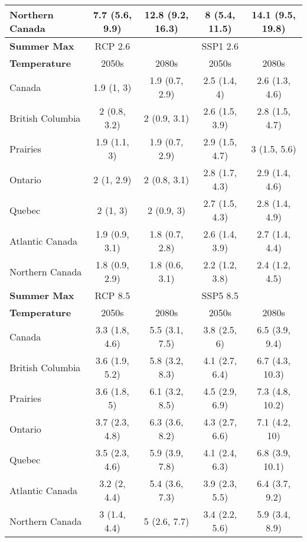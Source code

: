 \documentclass[]{scrartcl}
\begin{document}
\begin{appendices}
\begin{table}[t]
\begin{center}
\begin{tabularx}{\linewidth}{|L|cc|cc|}
			Northern Canada & 7.7 (5.6, 9.9) & 12.8 (9.2, 16.3) & 8 (5.4, 11.5) & 14.1 (9.5, 19.8) \\ 				
			\hline
			\hline
			\textbf{Summer Max} & RCP 2.6 & & SSP1 2.6 &   \\
			\textbf{Temperature} & 2050s & 2080s & 2050s &2080s \\
			\hline
			Canada & 1.9 (1, 3) & 1.9 (0.7, 2.9) & 2.5 (1.4, 4) & 2.6 (1.3, 4.6) \\ 
			British Columbia & 2 (0.8, 3.2) & 2 (0.9, 3.1) & 2.6 (1.5, 3.9) & 2.8 (1.5, 4.7) \\ 
			Prairies & 1.9 (1.1, 3) & 1.9 (0.7, 2.9) & 2.9 (1.5, 4.7) & 3 (1.5, 5.6) \\ 
			Ontario & 2 (1, 2.9) & 2 (0.8, 3.1) & 2.8 (1.7, 4.3) & 2.9 (1.4, 4.6) \\ 
			Quebec & 2 (1, 3) & 2 (0.9, 3) & 2.7 (1.5, 4.3) & 2.8 (1.4, 4.9) \\ 
			Atlantic Canada & 1.9 (0.9, 3.1) & 1.8 (0.7, 2.8) & 2.6 (1.4, 3.9) & 2.7 (1.4, 4.4) \\ 
			Northern Canada & 1.8 (0.9, 2.9) & 1.8 (0.6, 3.1) & 2.2 (1.2, 3.8) & 2.4 (1.2, 4.5) \\ 
			\hline
			\textbf{Summer Max} & RCP 8.5 & & SSP5 8.5 &   \\
			\textbf{Temperature} & 2050s & 2080s & 2050s &2080s \\
			\hline
			Canada & 3.3 (1.8, 4.6) & 5.5 (3.1, 7.5) & 3.8 (2.5, 6) & 6.5 (3.9, 9.4) \\ 
			British Columbia & 3.6 (1.9, 5.2) & 5.8 (3.2, 8.3) & 4.1 (2.7, 6.4) & 6.7 (4.3, 10.3) \\ 
			Prairies & 3.6 (1.8, 5) & 6.1 (3.2, 8.5) & 4.5 (2.9, 6.9) & 7.3 (4.8, 10.2) \\ 
			Ontario & 3.7 (2.3, 4.8) & 6.3 (3.6, 8.2) & 4.3 (2.7, 6.6) & 7.1 (4.2, 10) \\ 
			Quebec & 3.5 (2.3, 4.6) & 5.9 (3.9, 7.8) & 4.1 (2.4, 6.3) & 6.8 (3.9, 10.1) \\ 
			Atlantic Canada & 3.2 (2, 4.4) & 5.4 (3.6, 7.3) & 3.9 (2.3, 5.5) & 6.4 (3.7, 9.2) \\ 
			Northern Canada & 3 (1.4, 4.4) & 5 (2.6, 7.7) & 3.4 (2.2, 5.6) & 5.9 (3.4, 8.9) \\ 			
			\hline	
		\end{tabularx}
	\end{center}
\end{table}


\end{appendices}
\end{document}
